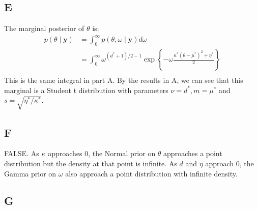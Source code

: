 \documentclass{article}
\begin{document}
\subsection*{E}
The marginal posterior of \(\theta\) is:
\begin{align*}
p(\theta \mid \mathbf{y}) &= \int_0^{\infty} p(\theta, \omega \mid \mathbf{y}) d\omega\\
&= \int_0^{\infty} \omega^{(d^*+1)/2-1} \exp \left\lbrace -\omega\frac{\kappa^*(\theta-\mu^*)^2 + \eta^*}{2}\right\rbrace\\
\end{align*}
This is the same integral in part A. By the results in A, we can see that this marginal is a Student t distribution with parameters \(\nu = d^*, m = \mu^*\) and \(s = \sqrt{\eta^*/\kappa^*}\).

\subsection*{F}
FALSE. As \(\kappa\) approaches \(0\), the Normal prior on \(\theta\) approaches a point distribution but the density at that point is infinite. As \(d\) and \(\eta\) approach \(0\), the Gamma prior on \(\omega\) also approach a point distribution with infinite density.

\subsection*{G}
\end{document}
